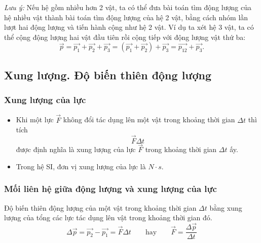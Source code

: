 \begin{itemize}
	\textit{Lưu ý:} Nếu hệ gồm nhiều hơn 2 vật, ta có thể đưa bài toán tìm động lượng của hệ nhiều vật thành bài toán tìm động lượng của hệ 2 vật, bằng cách nhóm lần lượt hai động lượng và tiến hành cộng như hệ 2 vật.	Ví dụ ta xét hệ 3 vật, ta có thể cộng động lượng hai vật đầu tiên rồi cộng tiếp với động lượng vật thứ ba:
	\begin{equation*}
		\vec{p}=\vec{p_1}+ \vec{p_2}+ \vec{p_3} = (\vec{p_1}+ \vec{p_2}) + \vec{p_3} = \vec{p_{12}} + \vec{p_3}.
	\end{equation*}
	
	
	
\end{itemize}
\subsection{Xung lượng. Độ biến thiên động lượng}
\subsubsection{Xung lượng của lực}
\begin{itemize}
	\item Khi một lực $\vec{F}$ không đổi tác dụng lên một vật trong khoảng thời gian $\Delta t$ thì tích $$\vec{F} \Delta t$$ được định nghĩa là xung lượng của lực $\vec{F}$ trong khoảng thời gian $\Delta t$ ấy. 
	\item Trong hệ SI, đơn vị xung lượng của lực là $N \cdot s$.
\end{itemize}
\subsubsection{Mối liên hệ giữa động lượng và xung lượng của lực}
Độ biến thiên động lượng của một vật trong khoảng thời gian $\Delta t$ bằng xung lượng của tổng các lực tác dụng lên vật trong khoảng thời gian đó.
\begin{equation*}
	\Delta \vec{p}=\vec{p_2} - \vec{p_1} =\vec{F} \Delta t \qquad\text{hay}\qquad \vec{F}=\dfrac{\Delta\vec{p}}{\Delta t}
\end{equation*}

